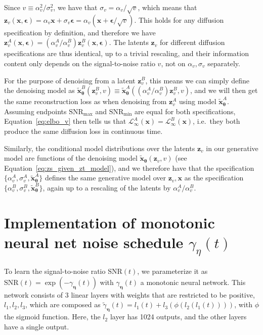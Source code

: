 \documentclass{article}
\def\Eqref#1{Equation~\ref{#1}}
\def\rvx{{\mathbf{x}}}
\def\rvz{{\mathbf{z}}}
\newcommand{\bT}{{\boldsymbol{\theta}}}
\newcommand{\boldeta}{{\boldsymbol{\eta}}}
\newcommand{\bepsilon}{{\boldsymbol{\epsilon}}}
\newcommand{\snr}{\text{SNR}}
\newcommand{\snrmin}{\text{SNR}_{\text{min}}}
\newcommand{\snrmax}{\text{SNR}_{\text{max}}}
\begin{document}
Since $v \equiv \alpha_v^2/\sigma_v^2$, we have that $\sigma_v = \alpha_v/\sqrt{v}$, which means that $\rvz_v(\rvx, \bepsilon) = \alpha_v \rvx + \sigma_v \bepsilon = \alpha_v( \rvx + \bepsilon/\sqrt{v})$. This holds for any diffusion specification by definition, and therefore we have $\rvz^A_v(\rvx, \bepsilon) = (\alpha^A_v/\alpha^B_v) \rvz_v^B(\rvx, \bepsilon)$. The latents $\rvz_v$ for different diffusion specifications are thus identical, up to a trivial rescaling, and their information content only depends on the signal-to-noise ratio $v$, not on $\alpha_v,\sigma_v$ separately.

For the purpose of denoising from a latent $\rvz^{B}_{v}$, this means we can simply define the denoising model as $\tilde{\rvx}^B_{\bT}(\rvz^{B}_{v}, v) \equiv \tilde{\rvx}^A_{\bT}((\alpha^A_v/\alpha^B_v)\rvz^{B}_{v}, v)$, and we will then get the same reconstruction loss as when denoising from $\rvz^{A}_{v}$ using model $\tilde{\rvx}^A_{\bT}$. Assuming endpoints $\snrmax$ and $\snrmin$ are equal for both specifications, \Eqref{eq:elbo_v} then tells us that $\mathcal{L}^A_{\infty}(\rvx) = \mathcal{L}^B_{\infty}(\rvx)$, i.e.\ they both produce the same diffusion loss in continuous time.

Similarly, the conditional model distributions over the latents $\rvz_{v}$ in our generative model are functions of the denoising model $\tilde{\rvx}_{\bT}(\rvz_{v}, v)$ (see Equation~\ref{eq:zs_given_zt_model}), and we therefore have that the specification $\{\alpha^A_v, \sigma^A_v, \tilde{\rvx}^A_{\bT}\}$ defines the same generative model over $\rvz_{v}, \rvx$ as the specification $\{\alpha^B_v, \sigma^B_v, \tilde{\rvx}^B_{\bT}\}$, again up to a rescaling of the latents by $\alpha^A_v/\alpha^B_v$.

\section{Implementation of monotonic neural net noise schedule $\gamma_{\eta}(t)$}
\label{app:monotonicnn}

To learn the signal-to-noise ratio $\snr(t)$, we parameterize it as $\snr(t) = \exp(-\gamma_{\boldeta}(t))$ with $\gamma_{\boldeta}(t)$ a monotonic neural network. This network consists of 3 linear layers with weights that are restricted to be positive, $l_{1},l_{2},l_{3}$, which are composed as $\tilde{\gamma}_{\boldeta}(t) = l_{1}(t)+l_{3}(\phi(l_{2}(l_{1}(t))))$, with $\phi$ the sigmoid function. Here, the $l_2$ layer has 1024 outputs, and the other layers have a single output.
\end{document}
